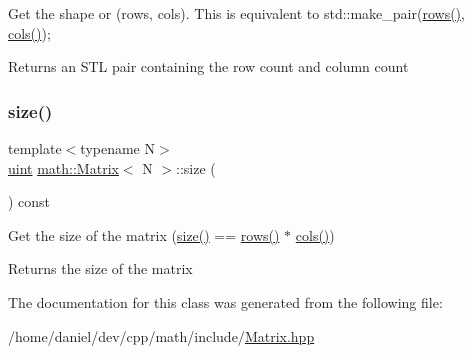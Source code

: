 Get the shape or (rows, cols). This is equivalent to {\ttfamily std\+::make\+\_\+pair(\hyperlink{classmath_1_1Matrix_a602173645d806afe305ed77b1ff38273}{rows()}, \hyperlink{classmath_1_1Matrix_ad78b49e12a607856df124a18a855aaf1}{cols()});} \begin{DoxyReturn}{Returns}
an S\+TL pair containing the row count and column count 
\end{DoxyReturn}
\mbox{\label{classmath_1_1Matrix_ae99135c51efc0077b694ab37ad64d5c0}} 
\subsubsection{\texorpdfstring{size()}{size()}}
{\footnotesize\ttfamily template$<$typename N$>$ \\
\hyperlink{typedefs_8h_a7b9b9413622e67b9df7f2d090b48682b}{uint} \hyperlink{classmath_1_1Matrix}{math\+::\+Matrix}$<$ N $>$\+::size (\begin{DoxyParamCaption}{ }\end{DoxyParamCaption}) const\hspace{0.3cm}{\ttfamily [inline]}}

Get the size of the matrix ({\ttfamily \hyperlink{classmath_1_1Matrix_ae99135c51efc0077b694ab37ad64d5c0}{size()} == \hyperlink{classmath_1_1Matrix_a602173645d806afe305ed77b1ff38273}{rows()} $\ast$ \hyperlink{classmath_1_1Matrix_ad78b49e12a607856df124a18a855aaf1}{cols()}}) \begin{DoxyReturn}{Returns}
the size of the matrix 
\end{DoxyReturn}


The documentation for this class was generated from the following file\+:\begin{DoxyCompactItemize}
\item 
/home/daniel/dev/cpp/math/include/\hyperlink{Matrix_8hpp}{Matrix.\+hpp}\end{DoxyCompactItemize}
